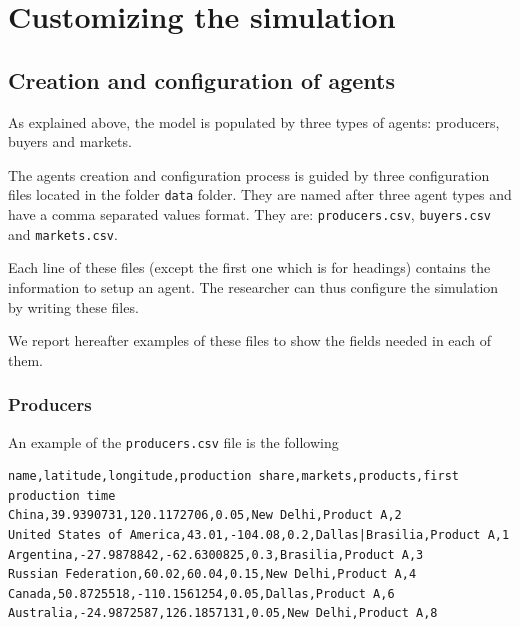 \documentclass{article}
\begin{document}
\vskip2mm





\section{Customizing the simulation}\label{sec:initialization}
\subsection{Creation and configuration of agents}

As explained above, the model is populated by three types of agents: producers, buyers and markets.

The agents creation and configuration process is guided by three configuration files located in the folder \verb+data+ folder.
They are named after three agent types and have a comma separated values format. They are: \verb+producers.csv+, \verb+buyers.csv+ and \verb+markets.csv+.

Each line of these files (except the first one which is for headings) contains the information to setup an agent. The researcher can thus configure the simulation by writing these files.

We report hereafter examples of these files to show the fields needed in each of them.

\subsubsection{Producers}
An example of the \verb+producers.csv+ file is the following 

\begin{verbatim}
name,latitude,longitude,production share,markets,products,first production time
China,39.9390731,120.1172706,0.05,New Delhi,Product A,2
United States of America,43.01,-104.08,0.2,Dallas|Brasilia,Product A,1
Argentina,-27.9878842,-62.6300825,0.3,Brasilia,Product A,3
Russian Federation,60.02,60.04,0.15,New Delhi,Product A,4
Canada,50.8725518,-110.1561254,0.05,Dallas,Product A,6
Australia,-24.9872587,126.1857131,0.05,New Delhi,Product A,8

\end{verbatim}
\end{document}
